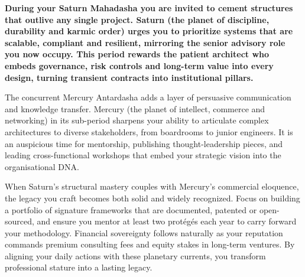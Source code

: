 
\label{topic41}

{\fontsize{9.5}{13.8}\selectfont\bfseries\color{DeepSlate} During your Saturn Mahadasha you are invited to cement structures that outlive any single project. Saturn (the planet of discipline, durability and karmic order) urges you to prioritize systems that are scalable, compliant and resilient, mirroring the senior advisory role you now occupy. This period rewards the patient architect who embeds governance, risk controls and long-term value into every design, turning transient contracts into institutional pillars.}\par\vspace{2mm}

{\fontsize{9}{13}\selectfont The concurrent Mercury Antardasha adds a layer of persuasive communication and knowledge transfer. Mercury (the planet of intellect, commerce and networking) in its sub-period sharpens your ability to articulate complex architectures to diverse stakeholders, from boardrooms to junior engineers. It is an auspicious time for mentorship, publishing thought-leadership pieces, and leading cross-functional workshops that embed your strategic vision into the organisational DNA.}\par\vspace{1.8mm}

{\fontsize{9}{13}\selectfont When Saturn's structural mastery couples with Mercury's commercial eloquence, the legacy you craft becomes both solid and widely recognized. Focus on building a portfolio of signature frameworks that are documented, patented or open-sourced, and ensure you mentor at least two protégés each year to carry forward your methodology. Financial sovereignty follows naturally as your reputation commands premium consulting fees and equity stakes in long-term ventures. By aligning your daily actions with these planetary currents, you transform professional stature into a lasting legacy.}\par\vspace{1.8mm}

{\fontsize{9}{13}\selectfont }\par\vspace{1.8mm}

